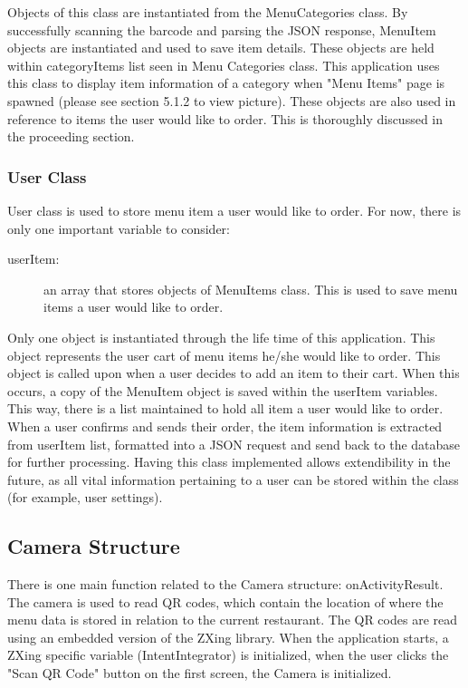 \documentclass[12pt, titlepage]{article}
\begin{document}
Objects of this class are instantiated from the MenuCategories class. By successfully scanning the barcode and parsing the JSON response, MenuItem objects are instantiated and used to save item details. These objects are held within categoryItems list seen in Menu Categories class. This application uses this class to display item information of a category when "Menu Items" page is spawned (please see section 5.1.2 to view picture). These objects are also used in reference to items the user would like to order. This is thoroughly discussed in the proceeding section.  

\subsubsection{User Class}
User class is used to store menu item a user would like to order. For now, there is only one important variable to consider: 

 \begin{description}
  \item[userItem:] an array that stores objects of MenuItems class. This is used to save menu items a user would like to order.
\end{description}

Only one object is instantiated through the life time of this application. This object represents the user cart of menu items he/she would like to order. This object is called upon when a user decides to add an item to their cart. When this occurs, a copy of the MenuItem object is saved within the userItem variables. This way, there is a list maintained to hold all item a user would like to order. When a user confirms and sends their order, the item information is extracted from userItem list, formatted into a JSON request and send back to the database for further processing. Having this class implemented allows extendibility in the future, as all vital information pertaining to a user can be stored within the class (for example, user settings). 


\subsection{Camera Structure}
There is one main function related to the Camera structure: onActivityResult. The camera is used to read QR codes, which contain the location of where the menu data is stored in relation to the current restaurant. The QR codes are read using an embedded version of the ZXing library. When the application starts, a ZXing specific variable (IntentIntegrator) is initialized, when the user clicks the "Scan QR Code" button on the first screen, the Camera is initialized. 
\end{document}
